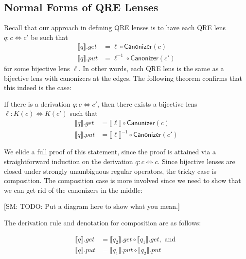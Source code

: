 \documentclass{svproc}
\newcommand{\FINISH}[3]{\ifdraft\textcolor{#1}{[#2: #3]}\fi}
\newcommand{\sam}[1]{\FINISH{dkpurple}{SM}{#1}}
\newcommand{\kw}[1]{\ensuremath{\mathsf{#1}}}
\newcommand{\canonizer}{\ensuremath{\kw{Canonizer}}}
\begin{document}
\subsection{Normal Forms of QRE Lenses}
Recall that our approach in defining QRE lenses is to have each QRE lens $q: c
\Leftrightarrow c'$ be such that 
\begin{align*}
\llbracket q \rrbracket.get &= \ell \circ \canonizer(c)\\
\llbracket q \rrbracket.put &= \ell^{-1} \circ
\canonizer(c')
\end{align*}
for some bijective lens $\ell$. In other words, each QRE lens is the same as a
bijective lens with canonizers at the edges. The following theorem confirms that
this indeed is the case:

\begin{theorem}\label{normal form}
If there is a derivation $q : c \Leftrightarrow c'$, then there exists a
bijective lens $\ell : K(c) \Leftrightarrow K(c')$ such that
\begin{align*}
\llbracket q \rrbracket.get &= \llbracket \ell \rrbracket\circ \canonizer(c)\\
\llbracket q \rrbracket.put &= \llbracket \ell \rrbracket^{-1} \circ
\canonizer(c')
\end{align*}
\end{theorem}
We elide a full proof of this statement, since the proof is attained via a
straightforward induction on the derivation $q : c \Leftrightarrow c$. Since
bijective lenses are closed under strongly unambiguous regular operators, the
tricky case is composition. The composition case is more involved since we need
to show that we can get rid of the canonizers in the middle:

\sam{TODO: Put a diagram here to show what you mean.}

The derivation rule and denotation for composition are as follows:
  \begin{prooftree}
\end{prooftree}

\begin{align*}
  \llbracket q \rrbracket.get &= \llbracket q_2 \rrbracket.get\circ \llbracket
  q_1 \rrbracket.get, \text{ and }\\
  \llbracket q \rrbracket.put &= \llbracket q_1 \rrbracket.put \circ \llbracket
  q_2 \rrbracket.put
  \end{align*}
  
\end{document}
